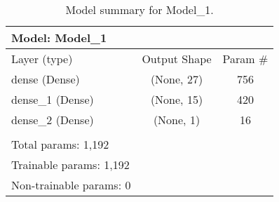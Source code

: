 \begin{table}[h] 
\begin{tabular}{lcc} 
Model: Model\_1 \\ \hline 
 Layer (type)                  & Output Shape                & Param \#    \\ \hline \hline 
 dense (Dense)                 & (None, 27)                  & 756        \\ \hline 
 dense\_1 (Dense)               & (None, 15)                  & 420        \\ \hline 
 dense\_2 (Dense)               & (None, 1)                   & 16         \\ \hline 
& & \\ \hline \hline 
Total params: 1,192 \\ 
Trainable params: 1,192 \\ 
Non-trainable params: 0 \\ \hline 
\end{tabular} 
\caption{Model summary for Model\_1.} 
\label{tab:model-summary} 
\end{table}